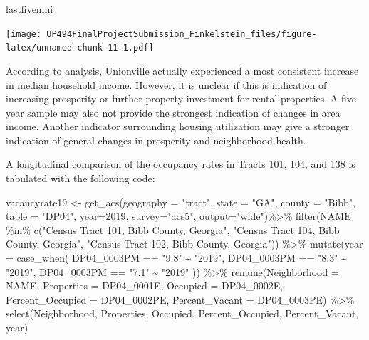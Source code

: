 \documentclass[
]{article}
\newenvironment{Shaded}{\begin{snugshade}}{\end{snugshade}}
\newcommand{\AttributeTok}[1]{\textcolor[rgb]{0.77,0.63,0.00}{#1}}
\newcommand{\DecValTok}[1]{\textcolor[rgb]{0.00,0.00,0.81}{#1}}
\newcommand{\FunctionTok}[1]{\textcolor[rgb]{0.00,0.00,0.00}{#1}}
\newcommand{\NormalTok}[1]{#1}
\newcommand{\OtherTok}[1]{\textcolor[rgb]{0.56,0.35,0.01}{#1}}
\newcommand{\SpecialCharTok}[1]{\textcolor[rgb]{0.00,0.00,0.00}{#1}}
\newcommand{\StringTok}[1]{\textcolor[rgb]{0.31,0.60,0.02}{#1}}
\begin{document}
\begin{Shaded}
\begin{Highlighting}[]
\NormalTok{lastfivemhi}
\end{Highlighting}
\end{Shaded}

\texttt{[image: UP494FinalProjectSubmission\_Finkelstein\_files/figure-latex/unnamed-chunk-11-1.pdf]}

According to analysis, Unionville actually experienced a most consistent
increase in median household income. However, it is unclear if this is
indication of increasing prosperity or further property investment for
rental properties. A five year sample may also not provide the strongest
indication of changes in area income. Another indicator surrounding
housing utilization may give a stronger indication of general changes in
prosperity and neighborhood health.

A longitudinal comparison of the occupancy rates in Tracts 101, 104, and
138 is tabulated with the following code:

\begin{Shaded}
\begin{Highlighting}[]
\NormalTok{vacancyrate19 }\OtherTok{\textless{}{-}} \FunctionTok{get\_acs}\NormalTok{(}\AttributeTok{geography =} \StringTok{"tract"}\NormalTok{, }\AttributeTok{state =} \StringTok{"GA"}\NormalTok{, }\AttributeTok{county =} \StringTok{"Bibb"}\NormalTok{, }\AttributeTok{table =} \StringTok{"DP04"}\NormalTok{,  }\AttributeTok{year=}\DecValTok{2019}\NormalTok{, }\AttributeTok{survey=}\StringTok{"acs5"}\NormalTok{, }\AttributeTok{output=}\StringTok{"wide"}\NormalTok{)}\SpecialCharTok{\%\textgreater{}\%}
\FunctionTok{filter}\NormalTok{(NAME }\SpecialCharTok{\%in\%} \FunctionTok{c}\NormalTok{(}\StringTok{"Census Tract 101, Bibb County, Georgia"}\NormalTok{, }\StringTok{"Census Tract 104, Bibb County, Georgia"}\NormalTok{, }\StringTok{"Census Tract 102, Bibb County, Georgia"}\NormalTok{)) }\SpecialCharTok{\%\textgreater{}\%}
  \FunctionTok{mutate}\NormalTok{(}\AttributeTok{year =} \FunctionTok{case\_when}\NormalTok{(}
\NormalTok{    DP04\_0003PM }\SpecialCharTok{==} \StringTok{"9.8"} \SpecialCharTok{\textasciitilde{}} \StringTok{"2019"}\NormalTok{,}
\NormalTok{    DP04\_0003PM }\SpecialCharTok{==} \StringTok{"8.3"} \SpecialCharTok{\textasciitilde{}} \StringTok{"2019"}\NormalTok{,}
\NormalTok{    DP04\_0003PM }\SpecialCharTok{==} \StringTok{"7.1"} \SpecialCharTok{\textasciitilde{}} \StringTok{"2019"}
\NormalTok{  )) }\SpecialCharTok{\%\textgreater{}\%}
  \FunctionTok{rename}\NormalTok{(}\AttributeTok{Neighborhood =}\NormalTok{ NAME,}
         \AttributeTok{Properties =}\NormalTok{ DP04\_0001E,}
         \AttributeTok{Occupied =}\NormalTok{ DP04\_0002E,}
         \AttributeTok{Percent\_Occupied =}\NormalTok{ DP04\_0002PE,}
         \AttributeTok{Percent\_Vacant =}\NormalTok{ DP04\_0003PE) }\SpecialCharTok{\%\textgreater{}\%}
   \FunctionTok{select}\NormalTok{(Neighborhood, Properties, Occupied, Percent\_Occupied, Percent\_Vacant, year) }
\end{Highlighting}
\end{Shaded}
\end{document}
